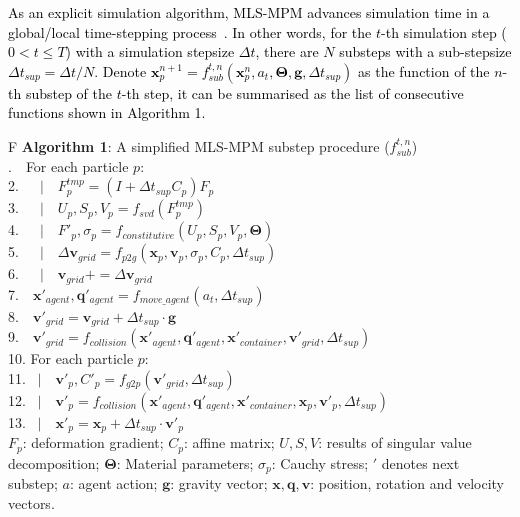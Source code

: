 \documentclass[letterpaper, 10 pt, journal, twoside]{ieeetran}
\newcommand{\rp}[1]{\textcolor{black}{#1}}
\begin{document}
\rp{As an explicit simulation algorithm, MLS-MPM advances simulation time in a global/local time-stepping process~\cite{hu2018moving}. In other words, for the $t$-th simulation step ($0 < t\leq T$) with a simulation stepsize $\Delta t$, there are $N$ substeps with a sub-stepsize $\Delta t_{sup}=\Delta t / N$. Denote $\pmb{x}^{n+1}_p = f_{sub}^{t,n}(\pmb{x}^n_p, a_t, \pmb{\Theta}, \pmb{g}, \Delta t_{sup})$ as the function of the $n$-th substep of the $t$-th step, it can be summarised as the list of consecutive functions shown in Algorithm 1.}

\begin{table}[b]
\small
\centering
\begin{tabular}{F}
\toprule
\textbf{Algorithm 1}: A simplified MLS-MPM substep procedure ($f^{t,n}_{sub}$)\\
.\ \ For each particle $p$:\\
2.\ \ \ $|$\ \ $F^{tmp}_p = (I + \Delta t_{sup} C_p) F_p$\\
3.\ \ \ $|$\ \ $U_p, S_p, V_p = f_{svd}(F^{tmp}_p)$\\
4.\ \ \ $|$\ \ $F'_p, \sigma_p = f_{constitutive}(U_p, S_p, V_p, \pmb{\Theta})$\\
5.\ \ \ $|$\ \ $\Delta \pmb{v}_{grid} = f_{p2g}(\pmb{x}_p, \pmb{v}_p, \sigma_p, C_p, \Delta t_{sup})$\\
6.\ \ \ $|$\ \ $\pmb{v}_{grid} +=\Delta \pmb{v}_{grid}$\\
7.\ \ $\pmb{x}'_{agent}, \pmb{q}'_{agent} = f_{move\_agent}(a_t, \Delta t_{sup})$\\
8.\ \ $\pmb{v}'_{grid} = \pmb{v}_{grid} + \Delta t_{sup}\cdot\pmb{g}$\\
9.\ \ $\pmb{v}'_{grid} = f_{collision}(\pmb{x}'_{agent}, \pmb{q}'_{agent}, \pmb{x}'_{container}, \pmb{v}'_{grid}, \Delta t_{sup})$\\
10. For each particle $p:$\\
11. \ $|$\ \ $\pmb{v}'_p, C'_p = f_{g2p}(\pmb{v}'_{grid}, \Delta t_{sup})$\\
12. \ $|$\ \ $\pmb{v}'_p = f_{collision}(\pmb{x}'_{agent}, \pmb{q}'_{agent}, \pmb{x}'_{container}, \pmb{x}_p, \pmb{v}'_p, \Delta t_{sup})$\\
13. \ $|$\ \ $\pmb{x}'_p = \pmb{x}_p + \Delta t_{sup}\cdot\pmb{v}'_p$\\
\bottomrule
\footnotesize $F_p$: deformation gradient; $C_p$: affine matrix; $U,S,V$: results of singular value decomposition; $\pmb{\Theta}$: Material parameters; $\sigma_p$: Cauchy stress; $'$ denotes next substep; $a$: agent action; $\pmb{g}$: gravity vector; $\pmb{x}, \pmb{q}, \pmb{v}$: position, rotation and velocity vectors.
\end{tabular}
\end{table}
\end{document}

